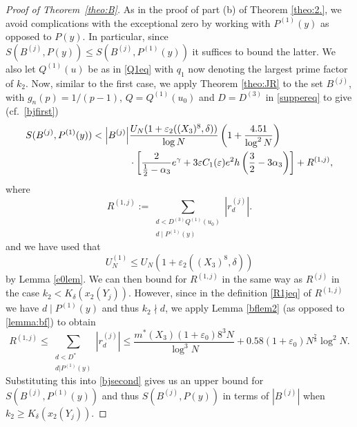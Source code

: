 \documentclass[12pt]{amsart}
\begin{document}
\begin{proof}[Proof of Theorem~\ref{theo:B}]
As in the proof of part (b) of Theorem \ref{theo:2.}, we avoid complications with the exceptional zero by working with $P^{(1)}(y)$ as opposed to $P(y)$. In particular, since $S(B^{(j)},P(y))\le S(B^{(j)},P^{(1)}(y))$ it suffices to bound the latter. We also let $Q^{(1)}(u)$ be as in \eqref{Q1eq} with $q_1$ now denoting the largest prime factor of $k_2$. Now, similar to the first case, we apply Theorem \ref{theo:JR} to the set $B^{(j)}$, with $g_n(p)=1/(p-1)$, $Q=Q^{(1)}(u_0)$ and $D=D^{(3)}$ in \eqref{suppereq} to give (cf.\ \eqref{bjfirst})
\begin{align}\label{bjsecond}
    S(B^{(j)},P^{(1)}(y))<\left|B^{(j)}\right|&\frac{U_N(1+\varepsilon_2((X_3)^8,\delta))}{\log N}\left( 1+\frac{4.51}{\log^2N}\right)\\
    &\cdot\left[\frac{2}{\frac{1}{2}-\alpha_3} e^{\gamma}+3\varepsilon C_{1}(\varepsilon) e^2h\left(\frac{3}{2}-3\alpha_3\right)\right]+R^{(1,j)},\notag
\end{align}
where
\begin{equation}\label{R1jeq}
    R^{(1,j)}:=\sum_{\substack{d<D^{(3)}Q^{(1)}(u_0)\\d\mid P^{(1)}(y)}}|r_d^{(j)}|.
\end{equation}
and we have used that
\begin{equation*}
    U_N^{(1)}\le U_N(1+\varepsilon_2((X_3)^8,\delta))
\end{equation*}
by Lemma \ref{e0lem}. We can then bound for $R^{(1,j)}$ in the same way as $R^{(j)}$ in the case $k_2<K_{\delta}(x_2(Y_j))$. However, since in the definition \eqref{R1jeq} of $R^{(1,j)}$ we have $d\mid P^{(1)}(y)$ and thus $k_2\nmid d$, we apply Lemma \ref{bflem2} (as opposed to \ref{lemma:bf}) to obtain
\begin{equation}\label{rjsecond}
    R^{(1,j)} \le  \sum_{\substack{d<D^*\\ d|P^{(1)}(y)}}\left|r_d^{(j)}\right|\le \frac{m^*(X_3)(1+\varepsilon_0)8^3N}{\log^3 N}+0.58(1+\varepsilon_0)N^{\frac{7}{8}}\log^2 N.
\end{equation}
Substituting this into \eqref{bjsecond} gives us an upper bound for $S(B^{(j)},P^{(1)}(y))$ and thus $S(B^{(j)},P(y))$ in terms of $|B^{(j)}|$ when $k_2\ge K_{\delta}(x_2(Y_j))$.\newline


\end{proof}
\end{document}
